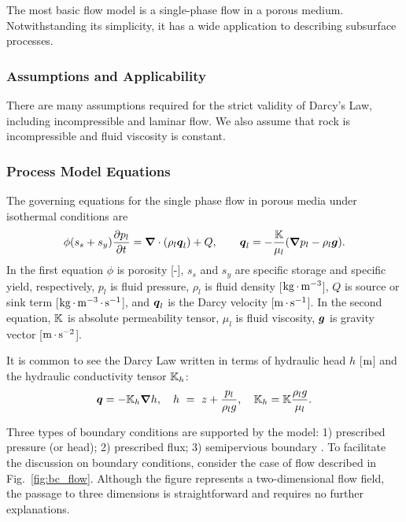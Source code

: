 The most basic flow model is a single-phase flow in a porous medium.  
Notwithstanding its simplicity, it has a wide application to
describing subsurface processes.


\subsubsection{Assumptions and Applicability}

There are many assumptions required for the strict validity of Darcy's
Law, including incompressible and laminar flow.
We also assume that rock is incompressible and fluid viscosity is constant.


\subsubsection{Process Model Equations}

The governing equations for the single phase flow in porous media 
under isothermal conditions are
\begin{equation}
  \phi (s_s + s_y) \frac{\partial p_l}{\partial t} 
  =
  \boldsymbol{\nabla} \cdot (\rho_l \boldsymbol{q}_l) + Q,
  \qquad
  {\boldsymbol{q}}_l = -\frac{{\mathbb K}}{\mu_l} 
  ({\boldsymbol{\nabla}} p_l - \rho_l {\boldsymbol{g}}).
\end{equation}
In the first equation $\phi$ is porosity [-],
$s_s$ and $s_y$ are specific storage and specific yield, respectively,
$p_l$ is fluid pressure,
$\rho_l$ is fluid density [${\rm kg} {\,\cdot\,} {\rm m}^{-3}$],
$Q$ is source or sink term [${\rm kg} {\,\cdot\,} {\rm m}^{-3} {\,\cdot\,} {\rm s}^{-1}$],
and ${\boldsymbol{q}}_l$ is the Darcy velocity [${\rm m} {\,\cdot\,} {\rm s}^{-1}$].
In the second equation, ${\mathbb K}$ is absolute permeability tensor,
$\mu_l$ is fluid viscosity,
${\boldsymbol{g}}$ is gravity vector [${\rm m} {\,\cdot\,} {\rm s}^{-2}$].

It is common to see the Darcy Law written in terms of hydraulic head $h$ [${\rm m}$]
and the hydraulic conductivity tensor ${\mathbb K}_h$:
\begin{equation}  \label{eq:HydraulicHead}
  {\boldsymbol{q}} = -{\mathbb K}_h {\boldsymbol{\nabla}} h,\quad
  h \ =\   z + \frac{p_l}{\rho_l g},\quad
  {\mathbb K}_h = {\mathbb K} \frac{\rho_l g}{\mu_l}.
\end{equation}

Three types of boundary conditions are supported by the model:
1) prescribed pressure (or head);
2) prescribed flux;
3) semipervious boundary \citep[for reference see][]{bear-1979}.
To facilitate the discussion on boundary conditions, consider the case of 
flow described in Fig.~\ref{fig:bc_flow}. 
Although the figure represents a two-dimensional flow field, the passage to three dimensions 
is straightforward and requires no further explanations. 

